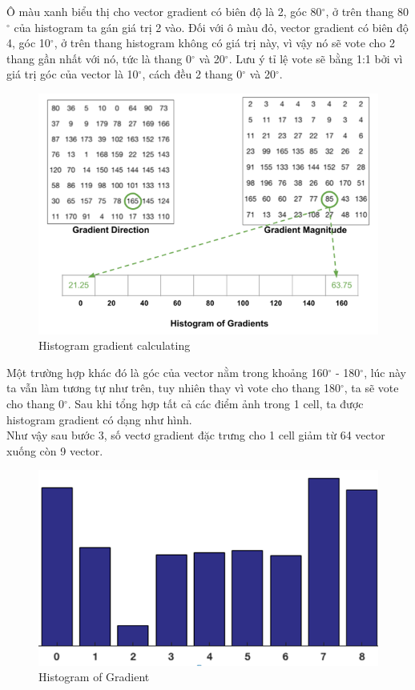 \documentclass[10pt,conference,a4paper]{IEEEtran}
\makeatletter
\def\ScaleIfNeeded{\ifdim\Gin@nat@width>\linewidth\linewidth\else\Gin@nat@width\fi}
\makeatother
\begin{document}
Ô màu xanh biểu thị cho vector gradient có biên độ là 2, góc 80$^\circ $, ở trên thang 80$^\circ $ của histogram ta gán giá trị 2 vào.  
Đối với ô màu đỏ, vector gradient có biên độ 4, góc 10$^\circ $, ở trên thang histogram không có giá trị này, vì vậy nó sẽ vote cho 2 thang gần nhất với  nó, tức là thang 0$^\circ $ và 20$^\circ $. Lưu ý tỉ lệ vote sẽ bằng 1:1 bởi vì giá trị góc của vector là 10$^\circ $, cách đều 2 thang 0$^\circ $ và 20$^\circ $.

\begin{figure}[ht]
	\centering
	\includegraphics[width=\ScaleIfNeeded]{"histogram gradient1"}
	\caption{Histogram gradient calculating}
	\label{fig:histogram-gradient1}
\end{figure}
Một trường hợp khác đó là góc của vector nằm trong khoảng 160$^\circ $ - 180$^\circ $, lúc này ta vẫn làm tương tự như trên, tuy nhiên thay vì vote cho thang 180$^\circ $, ta sẽ vote cho thang 0$^\circ $. Sau khi tổng hợp tất cả các điểm ảnh trong 1 cell, ta được histogram gradient có dạng như hình.\\
Như vậy sau bước 3, số vectơ gradient đặc trưng cho 1 cell giảm từ 64 vector xuống còn 9 vector.
\linebreak
\begin{figure}[ht]
	\centering
	\includegraphics[width=\ScaleIfNeeded]{"histogram gradient2"}
	\caption{Histogram of Gradient}
	\label{fig:histogram-gradient2}
\end{figure}
\end{document}
